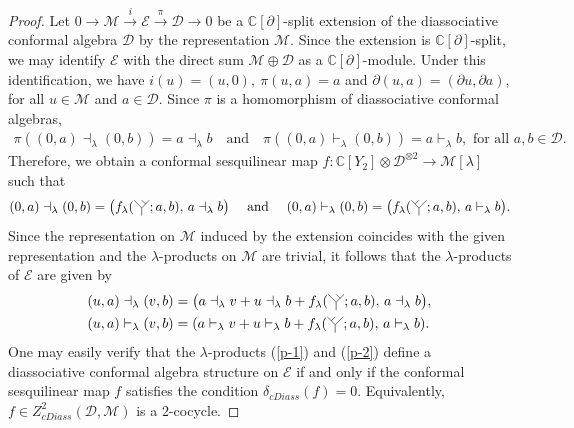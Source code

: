 \documentclass[10pt,a4paper]{amsart}
\newcommand{\C}{\mathbb{C}}
\newcommand{\D}{\mathcal{D}}
\newcommand{\E}{\mathcal{E}}
\newcommand{\M}{\mathcal{M}}
\newcommand{\la}{\lambda}
\newcommand{\p}{\partial}
\begin{document}
\begin{proof}
Let $0\longrightarrow
\M
\xrightarrow{\ i \ }
\E
\xrightarrow{\ \pi\ }
\D
\longrightarrow 0$ be a $\C[\p]$-split extension of the diassociative conformal algebra $\D$ by the representation $\M$. Since the extension is $\C[\p]$-split, we may identify $\E$ with the direct sum $\M \oplus \D$ as a $\C[\p]$-module. Under this identification, we have $i(u)=(u,0), ~ \! \pi(u,a)=a$ and $\p(u ,a)=(\p u,\p a)$, for all $u \in \M$ and $ a \in \D$. Since $\pi$ is a homomorphism of diassociative conformal algebras,
\begin{align*}
\pi ((0,a)\dashv_{\la}(0,b))=a \dashv_{\la} b ~~~ \text{ and } ~~~
\pi((0,a) \vdash_{\la} (0,b))=a \vdash_{\la} b,  \text{ for all } a, b \in \D.
\end{align*}
Therefore, we obtain a conformal sesquilinear map $f : \C[Y_2]\otimes \D^{\otimes 2 } \to \M[\la]$ such that
\begin{align*}
(0, a) \dashv_{\la}(0,b)
=
\big(f_{\la} (\tikz[baseline=-0.5ex,scale=0.20]{
  \draw (-1,1)--(0,0);
  \draw (1,1)--(0,0);
  \draw (0,0)--(0,-1);
  \draw (0.5,0.5)--(0,1);
};a, b ), \, a \dashv_{\la} b \big) ~~~ \text{ and } ~~~ (0,a) \vdash_{\la} (0,b) = \big(f_{\la} (\tikz[baseline=-0.5ex,scale=0.20]{
  \draw (-1,1)--(0,0);
  \draw (1,1)--(0,0);
  \draw (0,0)--(0,-1);
  \draw (-0.5,0.5)--(0,1);
};  a, b ), \, a \vdash_{\la} b \big).
\end{align*}
Since the representation on $\M$ induced by the extension coincides with the given representation and the $\la$-products on $\M$ are trivial, it follows that the $\la$-products of $\E$ are given by
\begin{align}
(u, a) \dashv_{\la} (v ,b) &=
\big(
a \dashv_{\la} v
+
u \dashv_{\la} b
+
f_{\la} (\tikz[baseline=-0.5ex,scale=0.20]{
  \draw (-1,1)--(0,0);
  \draw (1,1)--(0,0);
  \draw (0,0)--(0,-1);
  \draw (0.5,0.5)--(0,1);
};a, b ),
\,
a \dashv_{\la} b
\big), \label{p-1}\\
(u, a)\vdash_{\la}(v, b)
&=
(
a \vdash_{\la} v
+
u \vdash_{\la} b
+
f_{\la} (\tikz[baseline=-0.5ex,scale=0.20]{
  \draw (-1,1)--(0,0);
  \draw (1,1)--(0,0);
  \draw (0,0)--(0,-1);
  \draw (-0.5,0.5)--(0,1);
};a, b ),
\,
a \vdash_{\la} b
) \label{p-2}.
\end{align}
One may easily verify that the $\la$-products (\ref{p-1}) and (\ref{p-2}) define a diassociative conformal algebra structure on $\E$ if and only if the conformal sesquilinear map $f$ satisfies the condition $ \delta_{cDiass}(f)=0$. Equivalently, $f \in Z_{cDiass}^{2}(\D,\M)$ is a $2$-cocycle.


\end{proof}
\end{document}
